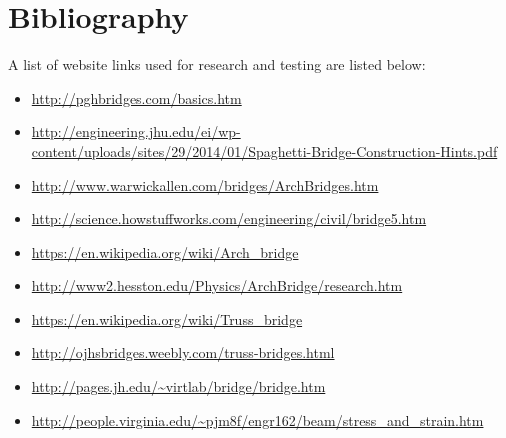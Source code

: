 \documentclass[a4paper,11pt]{article}
\begin{document}
\section{Bibliography}

A list of website links used for research and testing are listed below:

\begin{itemize}
\item \url{http://pghbridges.com/basics.htm}
\item \url{http://engineering.jhu.edu/ei/wp-content/uploads/sites/29/2014/01/Spaghetti-Bridge-Construction-Hints.pdf}
\item \url{http://www.warwickallen.com/bridges/ArchBridges.htm}
\item \url{http://science.howstuffworks.com/engineering/civil/bridge5.htm}
\item \url{https://en.wikipedia.org/wiki/Arch_bridge}
\item \url{http://www2.hesston.edu/Physics/ArchBridge/research.htm}
\item \url{https://en.wikipedia.org/wiki/Truss_bridge}
\item \url{http://ojhsbridges.weebly.com/truss-bridges.html}
\item \url{http://pages.jh.edu/~virtlab/bridge/bridge.htm}
\item \url{http://people.virginia.edu/~pjm8f/engr162/beam/stress_and_strain.htm}
\end{itemize}
\end{document}
